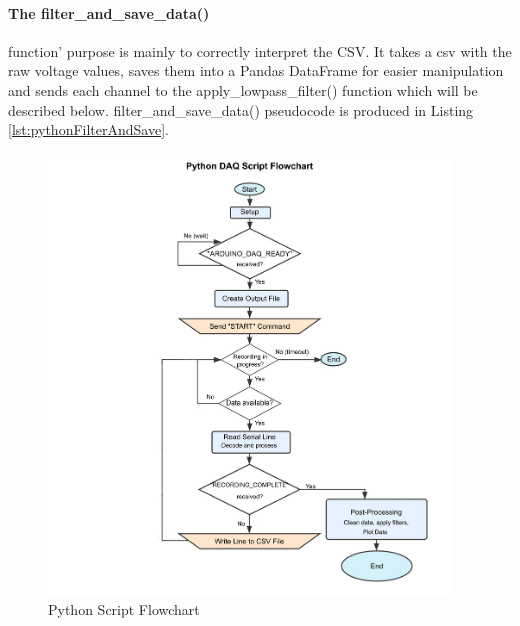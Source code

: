 \paragraph{The filter\_and\_save\_data()} function' purpose is mainly to correctly interpret the CSV. It takes a csv with the raw voltage values, saves them into a Pandas DataFrame for easier manipulation and sends each channel to the apply\_lowpass\_filter() function which will be described below. filter\_and\_save\_data() pseudocode is produced in Listing \ref{lst:pythonFilterAndSave}.

\begin{figure}[ptb] 
  \centering
  \includegraphics[width=0.95\textwidth]{chapters/methodology/ArduinoDAQ/python_serial_receive.jpg}
  \caption{Python Script Flowchart}
  \label{fig:pythonFlowchart}
\end{figure}

